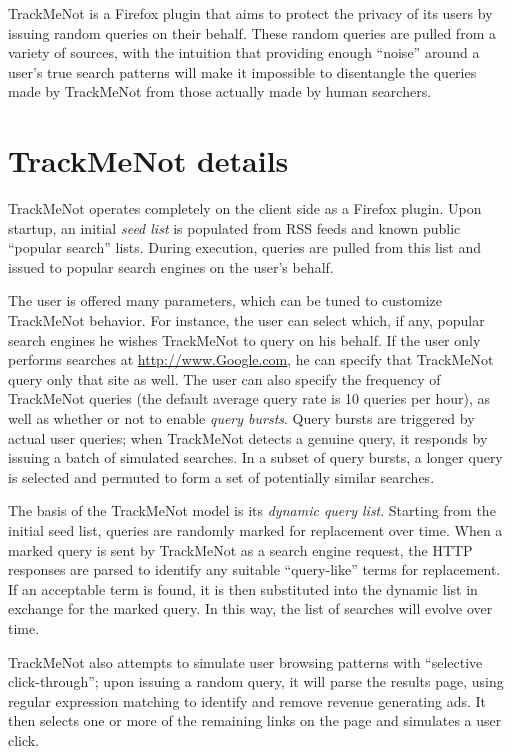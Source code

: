 \documentclass[11pt]{article}
\begin{document}
\begin{multicols}{2}
TrackMeNot is a Firefox plugin that aims to protect the privacy of its users by issuing random queries on their behalf. These random queries are pulled from a variety of sources, with the intuition that providing enough ``noise'' around a user's true search patterns will make it impossible to disentangle the queries made by TrackMeNot from those actually made by human searchers.

\section{TrackMeNot details}
\label{sec:tmn}
TrackMeNot operates completely on the client side as a Firefox plugin. Upon startup, an initial {\it seed list} is populated from RSS feeds and known public ``popular search'' lists. During execution, queries are pulled from this list and issued to popular search engines on the user's behalf.

The user is offered many parameters, which can be tuned to customize
TrackMeNot behavior. For instance, the user can select which, if any,
popular search engines he wishes TrackMeNot to query on his behalf. If
the user only performs searches at \url{http://www.Google.com}, he can
specify that TrackMeNot query only  that site as well. The user can
also specify the frequency of TrackMeNot queries (the default average
query rate is 10 queries per hour), as well as whether or not to enable {\it query
bursts}. Query bursts are triggered by actual user queries; when
TrackMeNot detects a genuine query, it responds by issuing a batch of
simulated searches. In a subset of query bursts, a longer query is
selected and permuted to form a set of potentially similar searches.

The basis of the TrackMeNot model is its {\it dynamic query
  list}. Starting from the initial seed list, queries are randomly
marked for replacement over time. When a marked query is sent by TrackMeNot as a
search engine request, the HTTP responses are parsed to identify any
suitable ``query-like'' terms for replacement. If an acceptable term
is found, it is then substituted into the dynamic list in exchange for
the marked query. In this way, the list of searches will evolve over
time.

TrackMeNot also attempts to simulate user browsing patterns with
``selective click-through''; upon issuing a random query,
it will parse the results page, using regular expression matching to
identify and remove revenue generating ads. It then selects one or
more of the remaining links on the page and simulates a user click.


\end{multicols}
\end{document}
